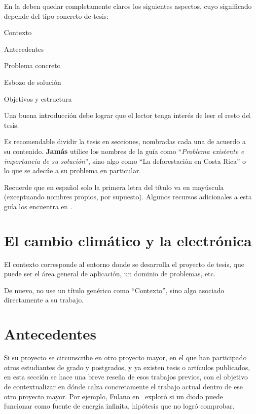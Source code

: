 En la  deben quedar completamente claros los siguientes
aspectos, cuyo significado depende del tipo concreto de tesis:

\begin{compactitem}
\item Contexto
\item Antecedentes
\item Problema concreto
\item Esbozo de solución
\item Objetivos y estructura
\end{compactitem}

Una buena introducción debe lograr que el lector tenga interés de leer el resto
del tesis.

Es recomendable dividir la tesis en secciones, nombradas cada una de acuerdo a
su contenido. \textbf{Jamás} utilice los nombres de la guía como
``\emph{Problema existente e importancia de su solución}'', sino algo como ``La
deforestación en Costa Rica'' o lo que se adecúe a su problema en particular.

Recuerde que en español solo la primera letra del título va en mayúscula
(exceptuando nombres propios, por supuesto).
%
Algunos recursos adicionales a esta guía los encuentra en \cite{AlvaradoWeb}.


\section{El cambio climático y la electrónica}
\label{sec:contexto}

El contexto corresponde al entorno donde se desarrolla el proyecto de
tesis, que puede ser el área general de aplicación, un dominio de
problemas, etc.

De nuevo, no use un título genérico como ``Contexto'', sino algo
asociado directamente a su trabajo.


\section{Antecedentes}

Si su proyecto se circunscribe en otro proyecto mayor, en el que han
participado otros estudiantes de grado y postgrados, y ya existen
tesis o artículos publicados, en esta sección se hace una breve reseña
de esos trabajos previos, con el objetivo de contextualizar en dónde
calza concretamente el trabajo actual dentro de ese otro proyecto
mayor.  Por ejemplo, Fulano en~\cite{Fulano21} exploró si un diodo
puede funcionar como fuente de energía infinita, hipótesis que no
logró comprobar.

